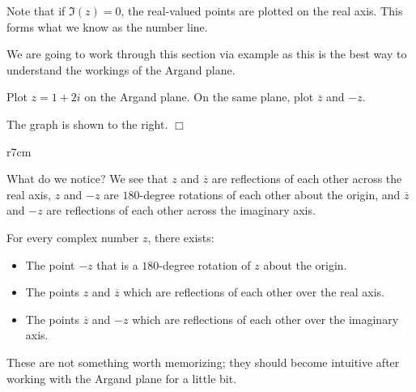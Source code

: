 \documentclass[lang=en,11pt]{elegantbook}
\begin{document}
Note that if $\Im(z)=0$, the real-valued points are plotted on the real axis.  This forms what we know as the number line.

We are going to work through this section via example as this is the best way to understand the workings of the Argand plane.
\begin{example}
Plot $z=1+2i$ on the Argand plane.  On the same plane, plot $\overline{z}$ and $-z$.
\end{example}
\begin{solution}
The graph is shown to the right.  $\Box$
\end{solution}
\begin{wrapfigure}{r}{7cm}
    \centering
{}
\end{wrapfigure}
\noindent What do we notice? We see that $z$ and $\overline{z}$ are reflections of each other across the real axis, $z$ and $-z$ are $180$-degree rotations of each other about the origin, and $\overline{z}$ and $-z$ are reflections of each other across the imaginary axis.  
\begin{note}
For every complex number $z$, there exists:
\begin{itemize}
    \item The point $-z$ that is a $180$-degree rotation of $z$ about the origin.
    \item The points $z$ and $\overline{z}$ which are reflections of each other over the real axis.
    \item The points $\overline{z}$ and $-z$ which are reflections of each other over the imaginary axis.
\end{itemize}
\end{note}
\noindent These are not something worth memorizing; they should become intuitive after working with the Argand plane for a little bit.
\end{document}
